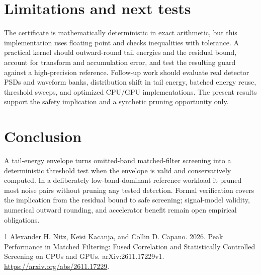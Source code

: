 \documentclass[11pt]{article}
\begin{document}
\section{Limitations and next tests}
The certificate is mathematically deterministic in exact arithmetic, but this implementation uses floating point and checks inequalities with tolerance. A practical kernel should outward-round tail energies and the residual bound, account for transform and accumulation error, and test the resulting guard against a high-precision reference. Follow-up work should evaluate real detector PSDs and waveform banks, distribution shift in tail energy, batched energy reuse, threshold sweeps, and optimized CPU/GPU implementations. The present results support the safety implication and a synthetic pruning opportunity only.

\section{Conclusion}
A tail-energy envelope turns omitted-band matched-filter screening into a deterministic threshold test when the envelope is valid and conservatively computed. In a deliberately low-band-dominant reference workload it pruned most noise pairs without pruning any tested detection. Formal verification covers the implication from the residual bound to safe screening; signal-model validity, numerical outward rounding, and accelerator benefit remain open empirical obligations.

\begin{thebibliography}{1}
Alexander H. Nitz, Keisi Kacanja, and Collin D. Capano. 2026.
\newblock Peak Performance in Matched Filtering: Fused Correlation and Statistically Controlled Screening on CPUs and GPUs.
\newblock arXiv:2611.17229v1. \url{https://arxiv.org/abs/2611.17229}.
\end{thebibliography}
\end{document}

